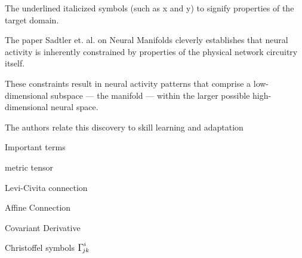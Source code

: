 \documentclass{amsart}
\newcommand{\Christoffel}[2]{\ensuremath{{\mathlarger{\mathlarger\Gamma}}^{#1}\!\!\!_{#2}}}
\begin{document}
The underlined italicized symbols (such as x and y) to signify properties of the target domain.




The paper Sadtler et. al. on Neural Manifolds cleverly establishes that neural activity is inherently constrained by properties of the physical network circuitry itself.

These constraints result in neural activity patterns that comprise a low-dimensional subspace — the manifold — within the larger possible high-dimensional neural space.

The authors relate this discovery to skill learning and adaptation


\clearpage

Important terms

metric tensor

Levi-Civita connection

Affine Connection

Covariant Derivative

Christoffel symbols $ \Christoffel{i}{jk} $
\end{document}
